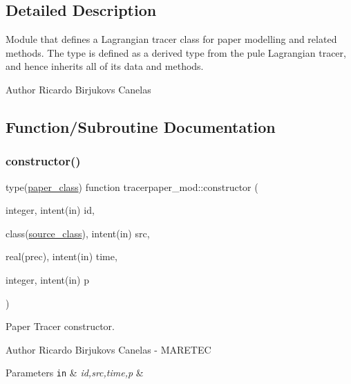 \subsection{Detailed Description}
Module that defines a Lagrangian tracer class for paper modelling and related methods. The type is defined as a derived type from the pule Lagrangian tracer, and hence inherits all of it\textquotesingle{}s data and methods. 

\begin{DoxyAuthor}{Author}
Ricardo Birjukovs Canelas 
\end{DoxyAuthor}


\subsection{Function/\+Subroutine Documentation}
\mbox{\label{namespacetracerpaper__mod_ad1bbc9d4e889b6aab71f0333cf6a5365}} 
\subsubsection{\texorpdfstring{constructor()}{constructor()}}
{\footnotesize\ttfamily type(\mbox{\hyperlink{structtracerpaper__mod_1_1paper__class}{paper\+\_\+class}}) function tracerpaper\+\_\+mod\+::constructor (\begin{DoxyParamCaption}\item[{integer, intent(in)}]{id,  }\item[{class(\mbox{\hyperlink{structsources__mod_1_1source__class}{source\+\_\+class}}), intent(in)}]{src,  }\item[{real(prec), intent(in)}]{time,  }\item[{integer, intent(in)}]{p }\end{DoxyParamCaption})\hspace{0.3cm}{\ttfamily [private]}}



Paper Tracer constructor. 

\begin{DoxyAuthor}{Author}
Ricardo Birjukovs Canelas -\/ M\+A\+R\+E\+T\+EC 
\end{DoxyAuthor}

\begin{DoxyParams}[1]{Parameters}
\mbox{\tt in}  & {\em id,src,time,p} & \\
\hline
\end{DoxyParams}


